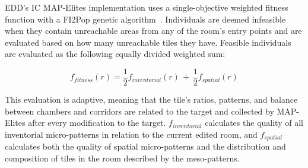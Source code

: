 




EDD's IC MAP-Elites implementation uses a single-objective weighted fitness function with a FI2Pop genetic algorithm~\cite{p9Kimbrough2008}. Individuals are deemed infeasible when they contain unreachable areas from any of the room's entry points and are evaluated based on how many unreachable tiles they have. Feasible individuals are evaluated as the following equally divided weighted sum:  

\begin{equation} 
\label{eq:fitness_func}
f_{fitness}(r) = \frac{1}{2}f_{inventorial}(r) \,+ \, \frac{1}{2}f_{spatial}(r)
\end{equation}

This evaluation is adaptive, meaning that the tile's ratios, patterns, and balance between chambers and corridors are related to the target and collected by MAP-Elites after every modification to the target. $f_{inventorial}$ calculates the quality of all inventorial micro-patterns in relation to the current edited room, and $f_{spatial}$ calculates both the quality of spatial micro-patterns and the distribution and composition of tiles in the room described by the meso-patterns.



